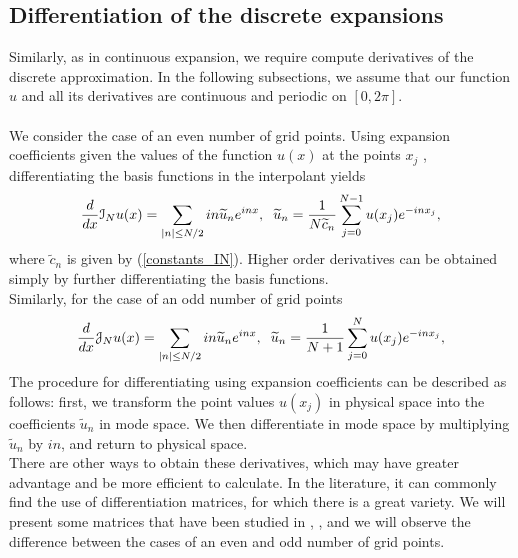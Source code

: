 	\newpage
    \subsection{Differentiation of the discrete expansions}
    
    Similarly, as in continuous expansion, we require compute derivatives of the discrete approximation. In the following subsections, we assume that our function $u$ and all its derivatives are continuous and periodic on $[0, 2\pi]$.\\
    \\
    We consider the case of an even number of grid points. Using expansion coefficients given the values of the function $u(x)$ at the points $x_j$ , differentiating the basis functions in the interpolant yields
    \begin{align}
        \frac{d}{dx} \mathcal{I}_N u(x) = \displaystyle \sum_{|n| \leq N/2} in \widetilde{u}_n e^{inx}, \hspace{2mm} \widetilde{u}_n = \displaystyle \frac{1}{N \widetilde{c}_n} \sum_{j=0}^{N-1} u(x_j) e^{-in x_j},   
    \end{align}
    where $\widetilde{c}_n$ is given by (\ref{constants_IN}). Higher order derivatives can be obtained simply by further differentiating the basis functions.\\
    
    \noindent Similarly, for the case of an odd number of grid points
    \begin{align}
    	\frac{d}{dx} \mathcal{J}_N u(x) = \displaystyle \sum_{|n| \leq N/2} in \widetilde{u}_n e^{inx}, \hspace{2mm} \widetilde{u}_n = \displaystyle \frac{1}{N + 1} \sum_{j=0}^{N} u(x_j) e^{-in x_j},   
    \end{align} 
    The procedure for differentiating using expansion coefficients can be described as follows: first, we transform the point values $u(x_j)$ in physical space into the coefficients $\widetilde{u}_n$ in mode space. We then differentiate in mode space by multiplying  $\widetilde{u}_n$ by $in$, and return to physical space.\\
    
    There are other ways to obtain these derivatives, which may have greater advantage and be more efficient to calculate. In the literature, it can commonly find the use of differentiation matrices, for which there is a great variety. We will present some matrices that have been studied in \cite{gottlieb2007}, \cite{Canuto2012}, and we will observe the difference between the cases of an even and odd number of grid points. \\
    
